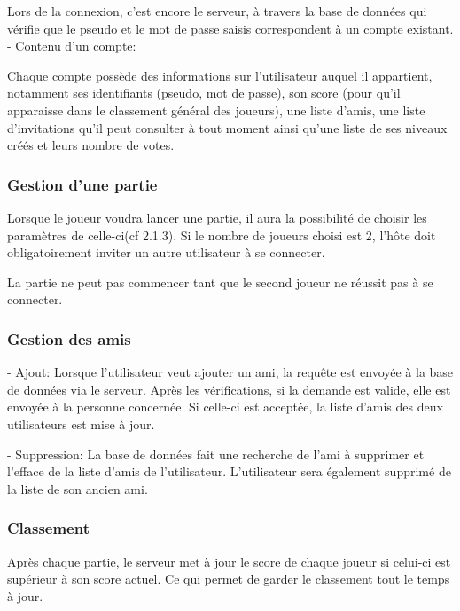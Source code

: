 \documentclass[a4paper,12pt]{article}
\begin{document}
Lors de la connexion, c'est encore le serveur, à travers la base de données qui vérifie que le pseudo et le mot de passe saisis correspondent à un compte existant.\\

- Contenu d'un compte:

Chaque compte possède des informations sur l'utilisateur auquel il appartient, notamment ses identifiants (pseudo, mot de passe), son score (pour qu'il apparaisse dans le classement général des joueurs), une liste d'amis, une liste d'invitations qu'il peut consulter à tout moment ainsi qu'une liste de ses niveaux créés et leurs nombre de votes.

\subsubsection{Gestion d'une partie}

Lorsque le joueur voudra lancer une partie,
il aura la possibilité de choisir les paramètres de celle-ci(cf 2.1.3). Si le nombre de joueurs choisi est 2, l'hôte doit obligatoirement inviter un autre utilisateur à se connecter.

La partie ne peut pas commencer tant que le second joueur ne réussit pas à se connecter.
\subsubsection{Gestion des amis}

- Ajout: 
Lorsque l'utilisateur veut ajouter un ami, la requête est envoyée à la base de données via le serveur. Après les vérifications, si la demande est valide, elle est envoyée à la personne concernée. Si celle-ci est acceptée, la liste d'amis des deux utilisateurs est mise à jour.

- Suppression: 
La base de données fait une recherche de l'ami à supprimer et l'efface de la liste d'amis de l'utilisateur. L'utilisateur sera également supprimé de la liste de son ancien ami.

\subsubsection{Classement}

Après chaque partie, le serveur met à jour le score de chaque joueur si celui-ci est supérieur à son score actuel. 
Ce qui permet de garder le classement tout le temps à jour. 
\end{document}
